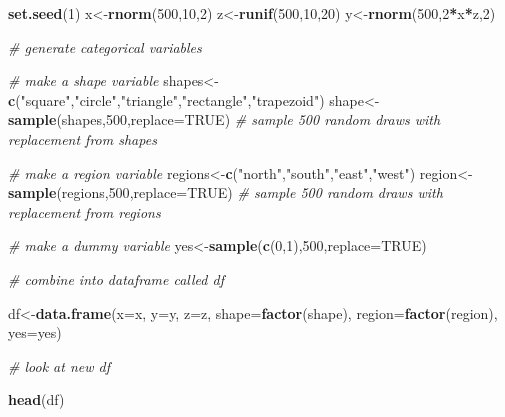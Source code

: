 \documentclass[]{book}
\newenvironment{Shaded}{\begin{snugshade}}{\end{snugshade}}
\newcommand{\KeywordTok}[1]{\textcolor[rgb]{0.13,0.29,0.53}{\textbf{#1}}}
\newcommand{\DataTypeTok}[1]{\textcolor[rgb]{0.13,0.29,0.53}{#1}}
\newcommand{\DecValTok}[1]{\textcolor[rgb]{0.00,0.00,0.81}{#1}}
\newcommand{\StringTok}[1]{\textcolor[rgb]{0.31,0.60,0.02}{#1}}
\newcommand{\CommentTok}[1]{\textcolor[rgb]{0.56,0.35,0.01}{\textit{#1}}}
\newcommand{\OtherTok}[1]{\textcolor[rgb]{0.56,0.35,0.01}{#1}}
\newcommand{\OperatorTok}[1]{\textcolor[rgb]{0.81,0.36,0.00}{\textbf{#1}}}
\newcommand{\NormalTok}[1]{#1}
\theoremstyle{definition}
\theoremstyle{definition}
\theoremstyle{definition}
\theoremstyle{remark}
\begin{document}
\begin{Shaded}
\begin{Highlighting}[]
\KeywordTok{set.seed}\NormalTok{(}\DecValTok{1}\NormalTok{)}
\NormalTok{x<-}\KeywordTok{rnorm}\NormalTok{(}\DecValTok{500}\NormalTok{,}\DecValTok{10}\NormalTok{,}\DecValTok{2}\NormalTok{)}
\NormalTok{z<-}\KeywordTok{runif}\NormalTok{(}\DecValTok{500}\NormalTok{,}\DecValTok{10}\NormalTok{,}\DecValTok{20}\NormalTok{)}
\NormalTok{y<-}\KeywordTok{rnorm}\NormalTok{(}\DecValTok{500}\NormalTok{,}\DecValTok{2}\OperatorTok{*}\NormalTok{x}\OperatorTok{*}\NormalTok{z,}\DecValTok{2}\NormalTok{)}

\CommentTok{# generate categorical variables}

\CommentTok{# make a shape variable }
\NormalTok{shapes<-}\KeywordTok{c}\NormalTok{(}\StringTok{"square"}\NormalTok{,}\StringTok{"circle"}\NormalTok{,}\StringTok{"triangle"}\NormalTok{,}\StringTok{"rectangle"}\NormalTok{,}\StringTok{"trapezoid"}\NormalTok{)}
\NormalTok{shape<-}\KeywordTok{sample}\NormalTok{(shapes,}\DecValTok{500}\NormalTok{,}\DataTypeTok{replace=}\OtherTok{TRUE}\NormalTok{) }\CommentTok{# sample 500 random draws with replacement from shapes}

\CommentTok{# make a region variable }
\NormalTok{regions<-}\KeywordTok{c}\NormalTok{(}\StringTok{"north"}\NormalTok{,}\StringTok{"south"}\NormalTok{,}\StringTok{"east"}\NormalTok{,}\StringTok{"west"}\NormalTok{)}
\NormalTok{region<-}\KeywordTok{sample}\NormalTok{(regions,}\DecValTok{500}\NormalTok{,}\DataTypeTok{replace=}\OtherTok{TRUE}\NormalTok{) }\CommentTok{# sample 500 random draws with replacement from regions}

\CommentTok{# make a dummy variable }
\NormalTok{yes<-}\KeywordTok{sample}\NormalTok{(}\KeywordTok{c}\NormalTok{(}\DecValTok{0}\NormalTok{,}\DecValTok{1}\NormalTok{),}\DecValTok{500}\NormalTok{,}\DataTypeTok{replace=}\OtherTok{TRUE}\NormalTok{) }

\CommentTok{# combine into dataframe called df}

\NormalTok{df<-}\KeywordTok{data.frame}\NormalTok{(}\DataTypeTok{x=}\NormalTok{x,}
               \DataTypeTok{y=}\NormalTok{y,}
               \DataTypeTok{z=}\NormalTok{z,}
               \DataTypeTok{shape=}\KeywordTok{factor}\NormalTok{(shape),}
               \DataTypeTok{region=}\KeywordTok{factor}\NormalTok{(region),}
               \DataTypeTok{yes=}\NormalTok{yes)}

\CommentTok{# look at new df}

\KeywordTok{head}\NormalTok{(df)}
\end{Highlighting}
\end{Shaded}
\end{document}
